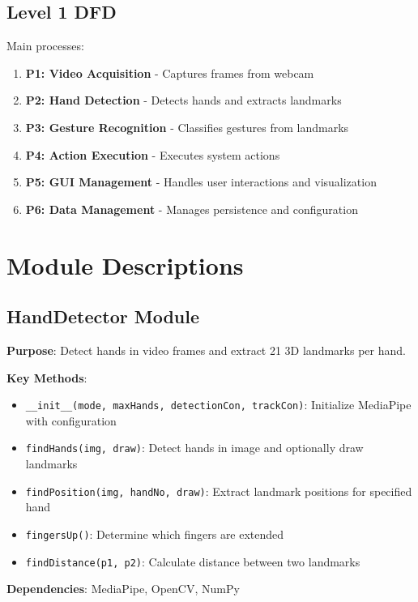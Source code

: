 \documentclass[12pt,a4paper]{report}
\begin{document}
\subsection{Level 1 DFD}

Main processes:
\begin{enumerate}
    \item \textbf{P1: Video Acquisition} - Captures frames from webcam
    \item \textbf{P2: Hand Detection} - Detects hands and extracts landmarks
    \item \textbf{P3: Gesture Recognition} - Classifies gestures from landmarks
    \item \textbf{P4: Action Execution} - Executes system actions
    \item \textbf{P5: GUI Management} - Handles user interactions and visualization
    \item \textbf{P6: Data Management} - Manages persistence and configuration
\end{enumerate}

\section{Module Descriptions}

\subsection{HandDetector Module}

\textbf{Purpose}: Detect hands in video frames and extract 21 3D landmarks per hand.

\textbf{Key Methods}:
\begin{itemize}
    \item \texttt{\_\_init\_\_(mode, maxHands, detectionCon, trackCon)}: Initialize MediaPipe with configuration
    \item \texttt{findHands(img, draw)}: Detect hands in image and optionally draw landmarks
    \item \texttt{findPosition(img, handNo, draw)}: Extract landmark positions for specified hand
    \item \texttt{fingersUp()}: Determine which fingers are extended
    \item \texttt{findDistance(p1, p2)}: Calculate distance between two landmarks
\end{itemize}

\textbf{Dependencies}: MediaPipe, OpenCV, NumPy
\end{document}
